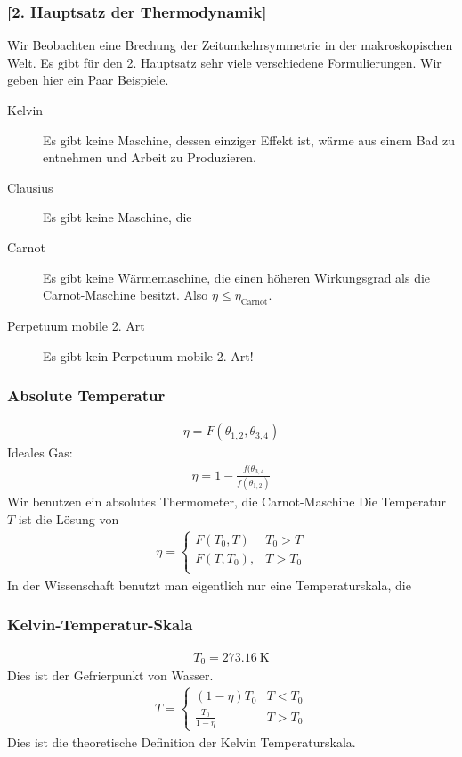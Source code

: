   \subsubsection*{[2. Hauptsatz der Thermodynamik]}
   
    Wir Beobachten eine Brechung der Zeitumkehrsymmetrie in der makroskopischen
    Welt.
    Es gibt für den 2. Hauptsatz sehr viele verschiedene Formulierungen.
    Wir geben hier ein Paar Beispiele.
    \begin{description}
      \item[Kelvin] Es gibt keine Maschine, dessen einziger Effekt ist, 
        wärme aus einem Bad zu entnehmen und Arbeit zu Produzieren.

      \item[Clausius] Es gibt keine Maschine, die 
      \item[Carnot] Es gibt keine Wärmemaschine, die einen höheren Wirkungsgrad
        als die Carnot-Maschine besitzt. Also $\eta \le \eta_{\text{Carnot}}$.

      \item[Perpetuum mobile 2. Art] Es gibt kein Perpetuum mobile 2. Art!
    \end{description}
\subsubsection*{Absolute Temperatur}
%
\begin{align*}
  \eta = F (\theta_{1,2}, \theta_{3,4})
\end{align*}
%
Ideales Gas:
%
\begin{align*}
  \eta = 1 -\frac{f(\theta_{3,4}}{f(\theta_{1,2})}
\end{align*}
%
Wir benutzen ein absolutes Thermometer, die Carnot-Maschine
%
Die Temperatur $T$ ist die Lösung von
\begin{align*}
  \eta = 
  \begin{cases}
    F(T_0, T)  & T_0 > T \\ 
    F(T, T_0), & T > T_0 \\
  \end{cases} 
\end{align*}
%
In der Wissenschaft benutzt man eigentlich nur eine Temperaturskala, die
\subsubsection*{Kelvin-Temperatur-Skala}
%
\begin{align*}
  T_0 = \SI{273,16}{\kelvin}
\end{align*}
%
Dies ist der Gefrierpunkt von Wasser.
%
\begin{align*}
  T = \begin{cases}
    (1- \eta) T_0 & T < T_0 \\
    \frac{T_0}{1- \eta} & T > T_0
  \end{cases} 
\end{align*}
%
Dies ist die theoretische Definition der Kelvin Temperaturskala.
